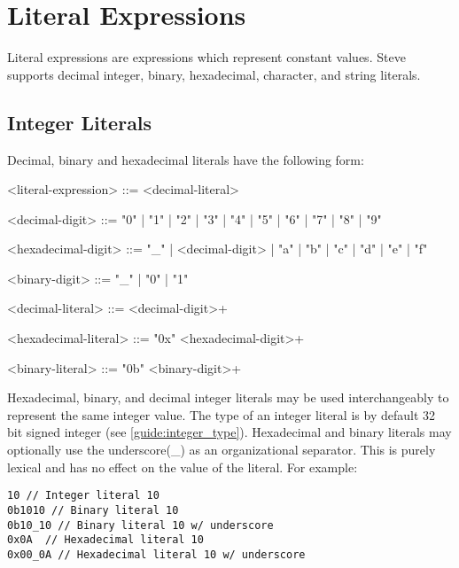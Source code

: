 \section{Literal Expressions} \label{guide:literal_expr}

Literal expressions are expressions which represent constant values. Steve supports decimal integer, binary, hexadecimal, character, and string literals.

\subsection{Integer Literals}

Decimal, binary and hexadecimal literals have the following form:

\begin{minip}
\begin{grammar}
<literal-expression> ::=
<decimal-literal>

<decimal-digit> ::= "0" | "1" | "2" | "3" | "4" | "5" | "6" | "7" | "8" | "9"

<hexadecimal-digit> ::= "_" | <decimal-digit> | "a" | "b" | "c" | "d" | "e" | "f"            

<binary-digit> ::= "_" | "0" | "1"

<decimal-literal> ::=
<decimal-digit>+

<hexadecimal-literal> ::=
"0x" <hexadecimal-digit>+

<binary-literal> ::=
"0b" <binary-digit>+
\end{grammar}
\end{minip}

Hexadecimal, binary, and decimal integer literals may be used interchangeably to represent the same integer value. The type of an integer literal is by default 32 bit signed integer (see \ref{guide:integer_type}). Hexadecimal and binary literals may optionally use the underscore(\_) as an organizational separator. This is purely lexical and has no effect on the value of the literal. For example:

\begin{minip}
\begin{lstlisting}
10 // Integer literal 10
0b1010 // Binary literal 10
0b10_10 // Binary literal 10 w/ underscore
0x0A  // Hexadecimal literal 10
0x00_0A // Hexadecimal literal 10 w/ underscore  
\end{lstlisting}
\end{minip}

